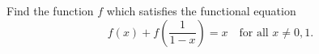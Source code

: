 Find the function $f$ which satisfies the functional equation
\[ f(x) + f\left(\frac{1}{1 - x}\right) = x \quad\text{for all } x \neq 0, 1. \]
